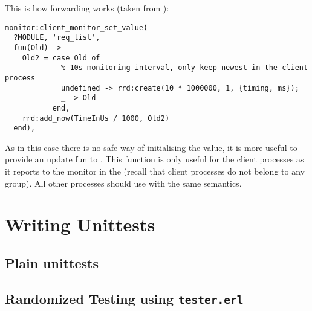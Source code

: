 This is how forwarding works (taken from ):

\begin{lstlisting}
monitor:client_monitor_set_value(
  ?MODULE, 'req_list',
  fun(Old) ->
    Old2 = case Old of
             % 10s monitoring interval, only keep newest in the client process
             undefined -> rrd:create(10 * 1000000, 1, {timing, ms});
             _ -> Old
           end,
    rrd:add_now(TimeInUs / 1000, Old2)
  end),
\end{lstlisting}

As in this case there is no safe way of initialising the value, it is more
useful to provide an update fun to
. This function is only useful
for the client processes as it reports to the monitor in the
 (recall that client processes do not belong to any group).
All other processes should use  with
the same semantics.

\section{Writing Unittests}

\subsection{Plain unittests}

\subsection{Randomized Testing using \texttt{tester.erl}}
